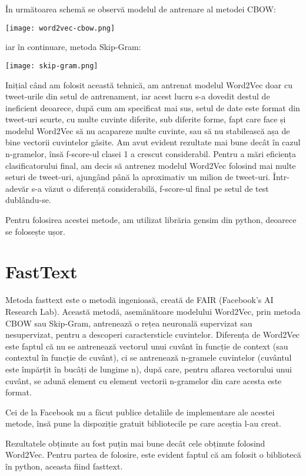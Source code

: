 În următoarea schemă se observă modelul de antrenare al metodei CBOW:

\texttt{[image: word2vec-cbow.png]}

iar în continuare, metoda Skip-Gram:

\texttt{[image: skip-gram.png]}



Inițial când am folosit această tehnică, am antrenat modelul Word2Vec doar cu tweet-urile din setul de antrenament,
iar acest lucru s-a dovedit destul de ineficient deoarece, după cum am specificat mai sus, setul de date este format
din tweet-uri scurte, cu multe cuvinte diferite, sub diferite forme, fapt care face și modelul Word2Vec să nu
acapareze multe cuvinte, sau să nu stabilească așa de bine vectorii cuvintelor găsite. Am avut evident rezultate 
mai bune decât în cazul n-gramelor, însă f-score-ul clasei 1 a crescut considerabil. Pentru a mări eficiența
clasificatorului final, am decis să antrenez modelul Word2Vec folosind mai multe seturi de tweet-uri, ajungând 
până la aproximativ un milion de tweet-uri. Într-adevăr s-a văzut o diferență considerabilă, f-score-ul final
pe setul de test dublându-se.

Pentru folosirea acestei metode, am utilizat librăria gensim din python, deoarece se folosește ușor. 


\section{FastText}

Metoda fasttext este o metodă ingenioasă, creată de FAIR (Facebook's AI Research Lab). Această metodă, asemănătoare
modelului Word2Vec, prin metoda CBOW sau Skip-Gram, antrenează o rețea neuronală supervizat sau nesupervizat, pentru
a descoperi caractersticle cuvintelor. Diferența de Word2Vec este faptul că nu se antrenează vectorul unui cuvânt 
în funcție de context (sau contextul în funcție de cuvânt), ci se antrenează n-gramele cuvintelor (cuvântul este împărțit în bucâți de lungime n),
după care, pentru aflarea vectorului unui cuvânt, se adună element cu element vectorii n-gramelor din care acesta este format.

Cei de la Facebook nu a făcut publice detaliile de implementare ale acestei metode, însă pune la dispoziție gratuit bibliotecile
pe care aceștia l-au creat.

Rezultatele obținute au fost puțin mai bune decât cele obținute folosind Word2Vec. Pentru partea de folosire, este evident
faptul că am folosit o bibliotecă în python, aceasta fiind fasttext.


